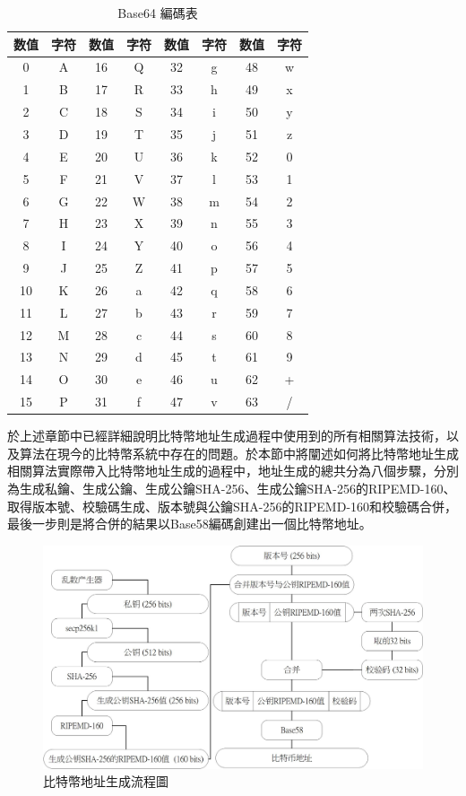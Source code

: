 					\begin{table}[!htbp]
					\centering
					\caption{Base64 編碼表}
					\label{Base64}
					\begin{tabular}{|c|c|c|c|c|c|c|c|}
					\hline
					数值 & 字符 & 数值 & 字符 & 数值 & 字符 & 数值 & 字符 \\ \hline
					0 & A & 16 & Q & 32 & g & 48 & w \\ \hline
					1 & B & 17 & R & 33 & h & 49 & x \\ \hline
					2 & C & 18 & S & 34 & i & 50 & y \\ \hline
					3 & D & 19 & T & 35 & j & 51 & z \\ \hline
					4 & E & 20 & U & 36 & k & 52 & 0 \\ \hline
					5 & F & 21 & V & 37 & l & 53 & 1 \\ \hline
					6 & G & 22 & W & 38 & m & 54 & 2 \\ \hline
					7 & H & 23 & X & 39 & n & 55 & 3 \\ \hline
					8 & I & 24 & Y & 40 & o & 56 & 4 \\ \hline
					9 & J & 25 & Z & 41 & p & 57 & 5 \\ \hline
					10 & K & 26 & a & 42 & q & 58 & 6 \\ \hline
					11 & L & 27 & b & 43 & r & 59 & 7 \\ \hline
					12 & M & 28 & c & 44 & s & 60 & 8 \\ \hline
					13 & N & 29 & d & 45 & t & 61 & 9 \\ \hline
					14 & O & 30 & e & 46 & u & 62 & + \\ \hline
					15 & P & 31 & f & 47 & v & 63 & / \\ \hline
					\end{tabular}
					\end{table}
			於上述章節中已經詳細說明⽐特幣地址⽣成過程中使⽤到的所有相關算法技術，以及算法在現今的⽐特幣系統中存在的問題。於本節中將闡述如何將比特幣地址生成相關算法實際帶入比特幣地址生成的過程中，地址生成的總共分為八個步驟，分別為生成私鑰、生成公鑰、生成公鑰SHA-256、生成公鑰SHA-256的RIPEMD-160、取得版本號、校驗碼生成、版本號與公鑰SHA-256的RIPEMD-160和校驗碼合併，最後一步則是將合併的結果以Base58編碼創建出一個比特幣地址。

			\begin{figure}[!htbp]
					\centering
					\includegraphics[width = .9\textwidth]{address.jpg}
					\caption{比特幣地址生成流程圖}\label{address}
			\end{figure}

